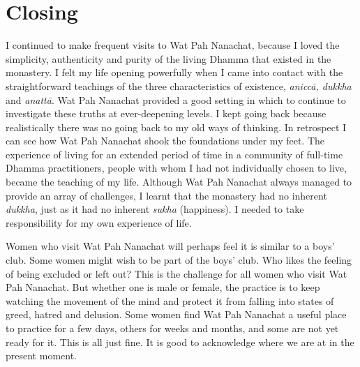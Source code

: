 \section{Closing}

I continued to make frequent visits to Wat Pah Nanachat, because I loved
the simplicity, authenticity and purity of the living Dhamma that
existed in the monastery. I felt my life opening powerfully when I came
into contact with the straightforward teachings of the three
characteristics of existence, \emph{aniccā, dukkha} and \emph{anattā}. 
Wat Pah Nanachat provided a good setting in which to continue to
investigate these truths at ever-deepening levels. I kept going back
because realistically there was no going back to my old ways of
thinking. In retrospect I can see how Wat Pah Nanachat shook the
foundations under my feet. The experience of living for an extended
period of time in a community of full-time Dhamma practitioners, people
with whom I had not individually chosen to live, became the teaching of
my life. Although Wat Pah Nanachat always managed to provide an array of
challenges, I learnt that the monastery had no inherent \emph{dukkha}, 
just as it had no inherent \emph{sukha} (happiness). I needed to take
responsibility for my own experience of life. 

Women who visit Wat Pah Nanachat will perhaps feel it is similar to a
boys' club. Some women might wish to be part of the boys' club. Who
likes the feeling of being excluded or left out? This is the challenge
for all women who visit Wat Pah Nanachat. But whether one is male or
female, the practice is to keep watching the movement of the mind and
protect it from falling into states of greed, hatred and delusion. Some
women find Wat Pah Nanachat a useful place to practice for a few days, 
others for weeks and months, and some are not yet ready for it. This is
all just fine. It is good to acknowledge where we are at in the present
moment. 

